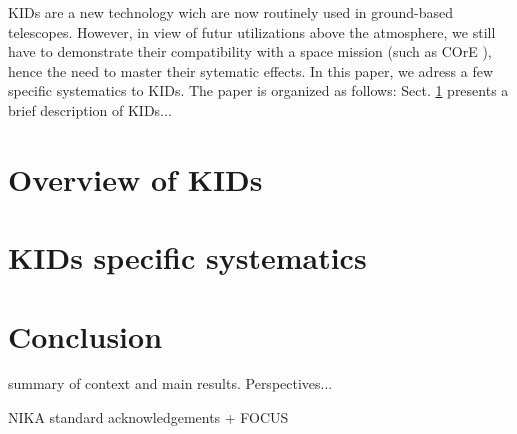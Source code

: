 \documentclass[twocolumn, traditabstract]{aa}
\begin{document}
KIDs are a new technology wich are now routinely used in ground-based telescopes. However, in view of futur utilizations above the atmosphere, we still have to demonstrate their compatibility with a space mission (such as COrE \citep{2016arXiv160907263D}), hence the need to master their sytematic effects. In this paper, we adress a few specific systematics to KIDs. The paper is organized as follows: Sect. \ref{sec2} presents a brief description of KIDs...











\section{Overview of KIDs}
\label{sec2}


\section{KIDs specific systematics}


\section{Conclusion}
\label{conclusion}

summary of context and main results. Perspectives...
 


\begin{acknowledgements}
NIKA standard acknowledgements + FOCUS
\end{acknowledgements}
\end{document}

